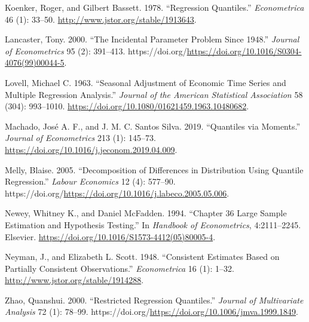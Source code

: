 \documentclass[
  letterpaper,
  DIV=11,
  numbers=noendperiod]{scrartcl}
\newlength{\cslhangindent}
\newlength{\cslentryspacingunit} %
\newenvironment{CSLReferences}[2] %
 {%
  \setlength{\parindent}{0pt}
  \ifodd #1
  \let\oldpar\par
  \def\par{\hangindent=\cslhangindent\oldpar}
  \fi
  \setlength{\parskip}{#2\cslentryspacingunit}
 }%
 {}
\begin{document}
\begin{CSLReferences}{1}{0}
\leavevmode{}%
Koenker, Roger, and Gilbert Bassett. 1978. {``Regression Quantiles.''}
\emph{Econometrica} 46 (1): 33--50.
\url{http://www.jstor.org/stable/1913643}.

\leavevmode{}%
Lancaster, Tony. 2000. {``The Incidental Parameter Problem Since
1948.''} \emph{Journal of Econometrics} 95 (2): 391--413.
https://doi.org/\url{https://doi.org/10.1016/S0304-4076(99)00044-5}.

\leavevmode{}%
Lovell, Michael C. 1963. {``Seasonal Adjustment of Economic Time Series
and Multiple Regression Analysis.''} \emph{Journal of the American
Statistical Association} 58 (304): 993--1010.
\url{https://doi.org/10.1080/01621459.1963.10480682}.

\leavevmode{}%
Machado, José A. F., and J. M. C. Santos Silva. 2019. {``Quantiles via
Moments.''} \emph{Journal of Econometrics} 213 (1): 145--73.
\url{https://doi.org/10.1016/j.jeconom.2019.04.009}.

\leavevmode{}%
Melly, Blaise. 2005. {``Decomposition of Differences in Distribution
Using Quantile Regression.''} \emph{Labour Economics} 12 (4): 577--90.
https://doi.org/\url{https://doi.org/10.1016/j.labeco.2005.05.006}.

\leavevmode{}%
Newey, Whitney K., and Daniel McFadden. 1994. {``Chapter 36 {Large}
Sample Estimation and Hypothesis Testing.''} In \emph{Handbook of
{Econometrics}}, 4:2111--2245. Elsevier.
\url{https://doi.org/10.1016/S1573-4412(05)80005-4}.

\leavevmode{}%
Neyman, J., and Elizabeth L. Scott. 1948. {``Consistent Estimates Based
on Partially Consistent Observations.''} \emph{Econometrica} 16 (1):
1--32. \url{http://www.jstor.org/stable/1914288}.

\leavevmode{}%
Zhao, Quanshui. 2000. {``Restricted {Regression} {Quantiles}.''}
\emph{Journal of Multivariate Analysis} 72 (1): 78--99.
https://doi.org/\url{https://doi.org/10.1006/jmva.1999.1849}.

\end{CSLReferences}
\end{document}

